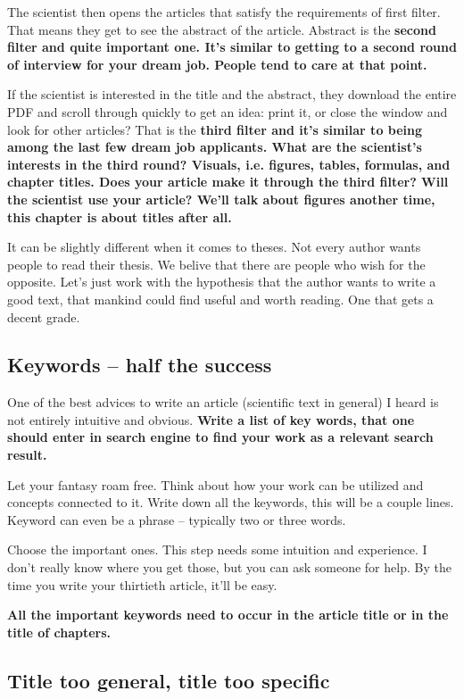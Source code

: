 The scientist then opens the articles that satisfy the requirements of first filter. That means they get to see the abstract of the article. Abstract is the \bf second filter \rm and quite important one. It's similar to getting to a second round of interview for your dream job. People tend to care at that point.

If the scientist is interested in the title and the abstract, they download the entire PDF and scroll through quickly to get an idea: print it, or close the window and look for other articles? That is the \bf third filter \rm and it's similar to being among the last few dream job applicants. What are the scientist's interests in the third round? Visuals, i.e. figures, tables, formulas, and chapter titles. Does your article make it through the third filter? Will the scientist use your article? We'll talk about figures another time, this chapter is about titles after all.

It can be slightly different when it comes to theses. Not every author wants people to read their thesis. We belive that there are people who wish for the opposite. Let's just work with the hypothesis that the author wants to write a good text, that mankind could find useful and worth reading. One that gets a decent grade.


\subsection*{Keywords -- half the success}

One of the best advices to write an article (scientific text in general) I heard is not entirely intuitive and obvious.
\bf Write a list of key words, that one should enter in search engine to find your work as a relevant search result. \rm

Let your fantasy roam free. Think about how your work can be utilized and concepts connected to it. Write down all the keywords, this will be a couple lines. Keyword can even be a phrase -- typically two or three words.

Choose the important ones. This step needs some intuition and experience. I don't really know where you get those, but you can ask someone for help. By the time you write your thirtieth article, it'll be easy.

\bf All the important keywords need to occur in the article title or in the title of chapters. \rm 

\subsection*{Title too general, title too specific}

